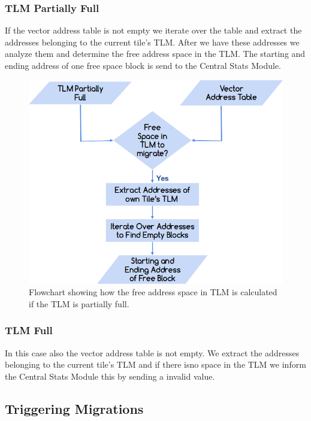 \documentclass{listhesis}
\begin{document}
\subsubsection{TLM Partially Full}
If the vector address table is not empty we iterate over the table and extract the addresses belonging to the current tile's TLM. After we have these addresses we analyze them and determine the free address space in the TLM. The starting and ending address of one free space block is send to the Central Stats Module.\\
\begin{figure}
  \includegraphics[width=0.7\linewidth]{tlmpartiallyempty.png}
  \centering
  \caption{Flowchart showing how the free address space in TLM is calculated if the TLM is partially full.}
  \label{fig:freeSpaceTLM}
\end{figure}
\subsubsection{TLM Full}
In this case also the vector address table is not empty. We extract the addresses belonging to the current tile's TLM and if there isno space in the TLM we inform the Central Stats Module this by sending a invalid value.\\
\subsection{Triggering Migrations}
\end{document}
